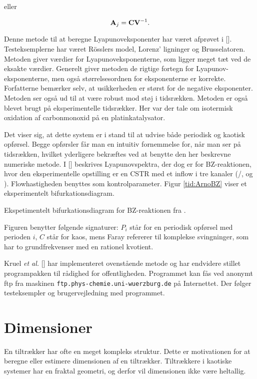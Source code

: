 eller

\[ \mbox{${\bf A}$}_j = \mbox{${\bf C}$}\mbox{${\bf V}$}^{-1}. \]

Denne metode til at beregne Lyapunoveksponenter har
v{\ae}ret afpr{\o}vet i []. Testeksemplerne
har v{\ae}ret R\"{o}sslers model, Lorenz' ligninger og
Brusselatoren. Metoden giver v{\ae}rdier for
Lyapunoveksponenterne, som ligger meget t{\ae}t ved de
eksakte v\ae rdier. Generelt giver metoden de rigtige
fortegn for Lyapunov-eksponenterne, men ogs{\aa}
st{\o}rrelsesordnen for eksponenterne er korrekte.
Forfatterne bem{\ae}rker selv, at usikkerheden er st{\o}rst
for de negative eksponenter. Metoden ser ogs{\aa} ud til at
v{\ae}re robust mod st{\o}j i tidsr{\ae}kken. Metoden er
ogs{\aa} blevet brugt p{\aa} eksperimentelle
tidsr{\ae}kker. Her var der tale om isotermisk oxidation af
carbonmonoxid p{\aa} en platinkatalysator.

\vspace{4.0mm}
Det viser sig, at dette system er i stand til at udvise
b{\aa}de periodisk og kaotisk opf{\o}rsel. Begge
opf{\o}rsler f{\aa}r man en intuitiv fornemmelse for,
n{\aa}r man ser p{\aa} tidsr{\ae}kken, hvilket yderligere 
bekr{\ae}ftes ved at benytte den her beskrevne numeriske metode.
I [] beskrives Lyapunovspektra,
der dog er for BZ-reaktionen, hvor den eksperimentelle
opstilling er en CSTR med et inflow i tre
kanaler (/, 
og ). Flowhastigheden benyttes som
kontrolparameter. Figur \ref{tid:ArnoBZ} viser et
eksperimentelt bifurkationsdiagram.

{
\caption{\protect\capsize
Ekspetimentelt bifurkationsdiagram for BZ-reaktionen fra
\protect\cite{Prag:Arno}.}
\label{tid:ArnoBZ}
}

Figuren benytter f{\o}lgende signaturer: $P_i$ st{\aa}r for
en periodisk opf{\o}rsel med perioden $i$, $C$ st{\aa}r for
kaos, mens Faray refererer til komplekse svingninger, som
har to grundfrekvenser med en rationel kvotient.

\vspace{4.0mm}
Kruel {\em et al.\/} [] har implementeret
ovenst{\aa}ende metode og har endvidere stillet
programpakken til r{\aa}dighed for
offentligheden. Programmet kan f{\aa}s ved anonymt ftp fra
maskinen {\tt ftp.phys-chemie.uni-wuerzburg.de} p{\aa}
Internettet. Der f{\o}lger testeksempler og
brugervejledning med programmet.
  
\section{Dimensioner}
\label{tid:dim}
En tiltr{\ae}kker har ofte en meget kompleks struktur.
Dette er motivationen for at beregne eller estimere
dimensionen af en tiltr{\ae}kker. Tiltr{\ae}kkere i
kaotiske systemer har en fraktal geometri, og derfor vil
dimensionen ikke v{\ae}re heltallig.

